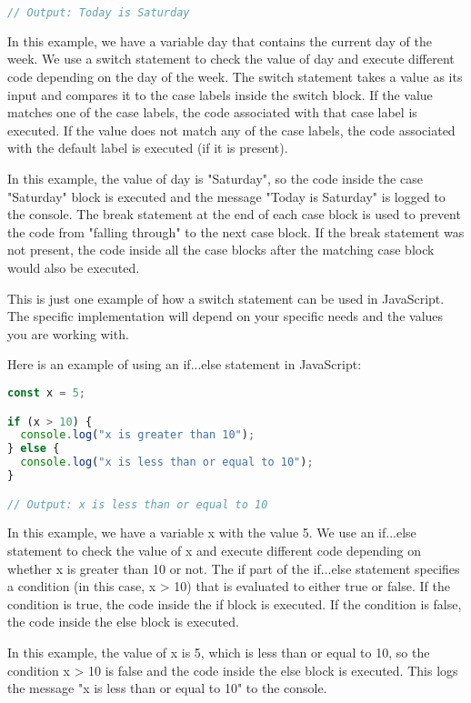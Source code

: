 {\begin{lstlisting}[language=Javascript, caption=Example switch statement in Javascript]
// Output: Today is Saturday

\end{lstlisting}
In this example, we have a variable day that contains the current day of the week. We use a switch statement to check the value of day and execute different code depending on the day of the week. The switch statement takes a value as its input and compares it to the case labels inside the switch block. If the value matches one of the case labels, the code associated with that case label is executed. If the value does not match any of the case labels, the code associated with the default label is executed (if it is present).

In this example, the value of day is "Saturday", so the code inside the case "Saturday" block is executed and the message "Today is Saturday" is logged to the console. The break statement at the end of each case block is used to prevent the code from "falling through" to the next case block. If the break statement was not present, the code inside all the case blocks after the matching case block would also be executed.

This is just one example of how a switch statement can be used in JavaScript. The specific implementation will depend on your specific needs and the values you are working with.


Here is an example of using an if...else statement in JavaScript:

\begin{lstlisting}[language=Javascript, caption=Example if else statement]
const x = 5;

if (x > 10) {
  console.log("x is greater than 10");
} else {
  console.log("x is less than or equal to 10");
}

// Output: x is less than or equal to 10

\end{lstlisting}

In this example, we have a variable x with the value 5. We use an if...else statement to check the value of x and execute different code depending on whether x is greater than 10 or not. The if part of the if...else statement specifies a condition (in this case, x > 10) that is evaluated to either true or false. If the condition is true, the code inside the if block is executed. If the condition is false, the code inside the else block is executed.

In this example, the value of x is 5, which is less than or equal to 10, so the condition x > 10 is false and the code inside the else block is executed. This logs the message "x is less than or equal to 10" to the console.

}
